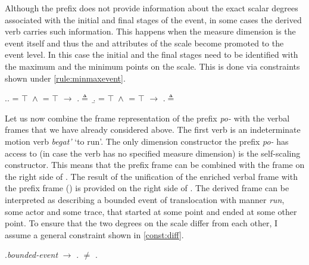 Although the prefix does not provide information about the exact scalar degrees associated with the initial and final stages of the event, in some cases the derived verb carries such information. This happens when the measure dimension is the event itself and thus the \MIN and \MAX attributes of the scale become promoted to the event level. In this case the initial and the final stages need to be identified with the maximum and the minimum points on the scale. This is done via constraints shown under \ref{rule:minmaxevent}.

\ex.\label{rule:minmaxevent}\a. \MIN = $\top$ $\,\wedge\,$ \INIT = $\top$ $\rightarrow$ \INIT.\POS $\triangleq$ \MIN
\b. \MAX = $\top$ $\,\wedge\,$ \FIN = $\top$ $\rightarrow$ \FIN.\POS $\triangleq$ \MAX

Let us now combine the frame representation of the prefix \textit{po-}   with the verbal frames that we have already considered above. The first verb is an indeterminate motion verb \textit{begat'} `to run'. The only dimension constructor the prefix \textit{po-}   has access to (in case the verb has no specified measure dimension) is the self-scaling constructor. This means that the prefix frame can be combined with the frame on the right side of . The result of the unification of the enriched verbal frame with the prefix frame () is provided on the right side of . The derived frame can be interpreted as describing a bounded event of translocation  with manner \textit{run}, some actor and some trace, that started at some point and ended at some other point. To ensure that the two degrees on the scale differ from each other, I assume a general constraint shown in \ref{const:diff}.

\ex.\label{const:diff}\textit{bounded-event} $\rightarrow$ \INIT.{\POS} $\neq$ \FIN.\POS

